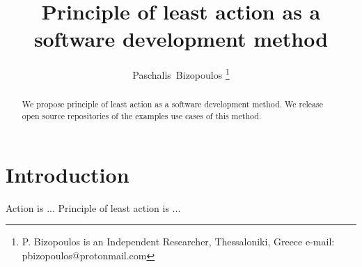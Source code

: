 \documentclass[journal]{IEEEtran}
\begin{document}

\title{Principle of least action as a software development method}

\author{Paschalis~Bizopoulos
\thanks{P. Bizopoulos is an Independent Researcher, Thessaloniki, Greece e-mail: pbizopoulos@protonmail.com}}

\maketitle

\begin{abstract}
	We propose principle of least action as a software development method.
	We release open source repositories of the examples use cases of this method.
\end{abstract}

\section{Introduction}
Action is ...
Principle of least action is ...
\end{document}
